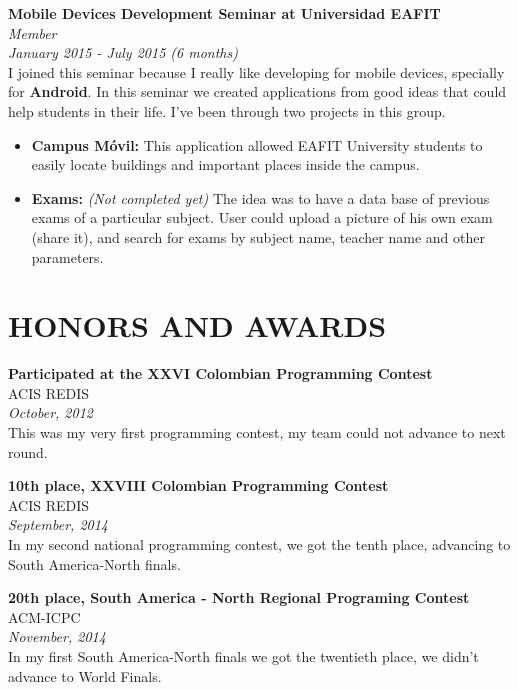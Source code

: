 \documentclass[margin, 10pt]{res} %
\begin{document}
\begin{resume}
\textbf{Mobile Devices Development Seminar at Universidad EAFIT} \\
\textit{Member} \\
\textit{January 2015 - July 2015 (6 months)} \\
I joined this seminar because I really like developing for mobile devices, specially for
\textbf{Android}. In this seminar we created applications from good ideas that could help
students in their life. I've been through two projects in this group.
\begin{itemize}
  \item \textbf{Campus Móvil:} This application allowed EAFIT University students to easily locate
                               buildings and important places inside the campus.
  \item \textbf{Exams:} \emph{(Not completed yet)} The idea was to have a data base of previous
                        exams of a particular subject. User could upload a picture of his own exam
                        (share it), and search for exams by subject name, teacher name and other
                        parameters.
\end{itemize}



\section{HONORS AND AWARDS}

\textbf{Participated at the XXVI Colombian Programming Contest} \\
ACIS REDIS \\
\textit{October, 2012} \\
This was my very first programming contest, my team could not advance to next round.

\textbf{10th place, XXVIII Colombian Programming Contest} \\
ACIS REDIS \\
\textit{September, 2014} \\
In my second national programming contest, we got the tenth place, advancing to South America-North
finals.

\textbf{20th place, South America - North Regional Programing Contest} \\
ACM-ICPC \\
\textit{November, 2014} \\
In my first South America-North finals we got the twentieth place, we didn't advance to World
Finals.


\end{resume}
\end{document}
